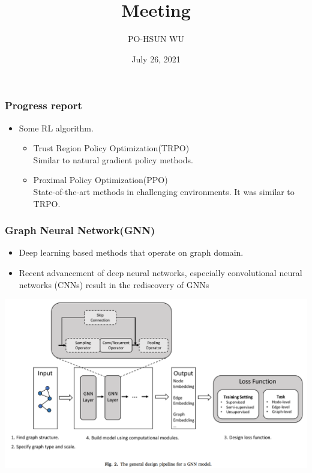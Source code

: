 \documentclass{beamer}
\date{July 26, 2021}
\title{Meeting}
\author{PO-HSUN WU}
\begin{document}
    \frame{\titlepage}

    \begin{frame}
        \frametitle{Progress report}
        \begin{itemize}
            \item Some RL algorithm.
            \begin{itemize}
                \item Trust Region Policy Optimization(TRPO)\\
                \hspace{1em}Similar to natural gradient policy methods.
                \item Proximal Policy Optimization(PPO)\\
                \hspace{1em}State-of-the-art methods in challenging environments. It was similar to TRPO.
            \end{itemize}
        \end{itemize}
    \end{frame}

    \begin{frame}
        \frametitle{Graph Neural Network(GNN)}
        \begin{itemize}
            \item Deep learning based methods that operate on graph domain.
            \item Recent advancement of deep neural networks, especially convolutional neural networks (CNNs) result in the rediscovery of GNNs
        \end{itemize}
        \centering
        \includegraphics[scale=.25]{Design_GNN.PNG}
    \end{frame}
\end{document}
